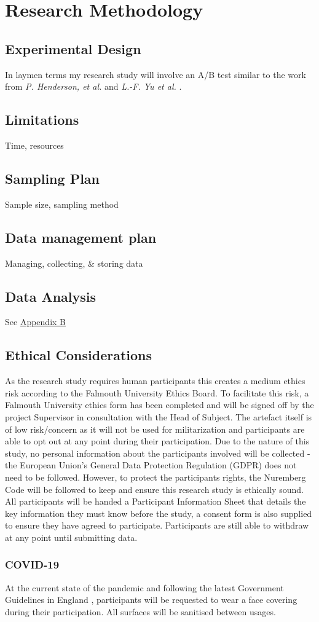 \section{Research Methodology}

\subsection{Experimental Design}
In laymen terms my research study will involve an A/B test similar to the work from \textit{P. Henderson, et al.} \cite{constrained-layouts} and \textit{L.-F. Yu et al.} \cite{make-it-home}.
\subsection{Limitations}
Time, resources

\subsection{Sampling Plan}
Sample size, sampling method

\subsection{Data management plan}
Managing, collecting, \& storing data

\subsection{Data Analysis}
See \hyperref[append:b]{Appendix B}

\subsection{Ethical Considerations}
As the research study requires human participants this creates a medium ethics risk according to the Falmouth University Ethics Board. To facilitate this risk, a Falmouth University ethics form has been completed and will be signed off by the project Supervisor in consultation with the Head of Subject. The artefact itself is of low risk/concern as it will not be used for militarization and participants are able to opt out at any point during their participation.
Due to the nature of this study, no personal information about the participants involved will be collected - the European Union's General Data Protection Regulation (GDPR)\cite{gdpr} does not need to be followed. However, to protect the participants rights, the Nuremberg Code will be followed to keep and ensure this research study is ethically sound\cite{nuremberg-code}. All participants will be handed a Participant Information Sheet that details the key information they must know before the study, a consent form is also supplied to ensure they have agreed to participate. Participants are still able to withdraw at any point until submitting data.
\subsubsection*{COVID-19}
At the current state of the pandemic and following the latest Government Guidelines in England \cite{gov-guidlines}, participants will be requested to wear a face covering during their participation. All surfaces will be sanitised between usages.